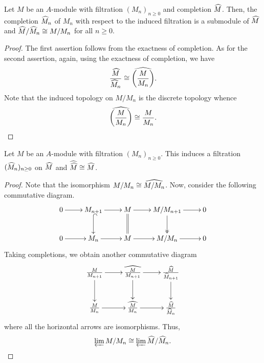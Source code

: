 \begin{corollary}
    Let $M$ be an $A$-module with filtration $(M_n)_{n\ge 0}$ and completion $\widehat{M}$. Then, the completion $\widehat{M}_n$ of $M_n$ with respect to the induced filtration is a submodule of $\widehat{M}$ and $\widehat{M}/\widehat{M}_n\cong M/M_n$ for all $n\ge 0$.
\end{corollary}
\begin{proof}
    The first assertion follows from the exactness of completion. As for the second assertion, again, using the exactness of completion, we have 
    \begin{equation*}
        \frac{\widehat{M}}{\widehat{M}_n}\cong\widehat{\left(\frac{M}{M_n}\right)}.
    \end{equation*}
    Note that the induced topology on $M/M_n$ is the discrete topology whence 
    \begin{equation*}
        \widehat{\left(\frac{M}{M_n}\right)}\cong\frac{M}{M_n}.\qedhere
    \end{equation*}
\end{proof}

\begin{corollary}
    Let $M$ be an $A$-module with filtration $(M_n)_{n\ge 0}$. This induces a filtration $(\widehat{M}_n)_{n\ge 0}$ on $\widehat{M}$ and $\widehat{\widehat{M}}\cong\widehat{M}$.
\end{corollary}
\begin{proof}
    Note that the isomorphism $M/M_n\cong\widehat{M/M_n}$. Now, consider the following commutative diagram.
    \begin{equation*}
        \xymatrix {
            0\ar[r] & M_{n + 1}\ar[r]\ar@{^{(}->}[d] & M\ar[r]\ar@{=}[d] & M/M_{n + 1}\ar[r]\ar@{->>}[d] & 0\\
            0\ar[r] & M_n\ar[r] & M\ar[r] & M/M_n\ar[r] & 0
        }
    \end{equation*}
    Taking completions, we obtain another commutative diagram
    \begin{equation*}
        \xymatrix {
            \frac{M}{M_{n + 1}}\ar[r]\ar[d] &\wh{\frac{M}{M_{n + 1}}}\ar[r]\ar[d] &  \frac{\wh M}{\wh M_{n + 1}}\ar[d]\\
            \frac{M}{M_n}\ar[r] &\wh{\frac{M}{M_n}}\ar[r] &\frac{\wh M}{\wh M_n}
        }
    \end{equation*}
    where all the horizontal arrows are isomorphisms. Thus, 
    \begin{equation*}
        \varprojlim M/M_n\cong\varprojlim\widehat{M}/\widehat{M}_n.\qedhere
    \end{equation*}
\end{proof}

